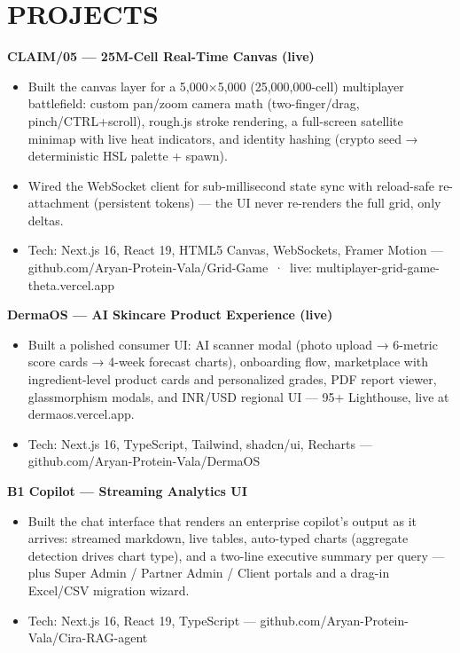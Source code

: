 \documentclass[9pt]{article}
\begin{document}
\section*{PROJECTS}
\textbf{CLAIM/05  ---  25M-Cell Real-Time Canvas (live)}
\vspace{1pt}
\begin{itemize}[leftmargin=11pt,itemsep=0pt,topsep=1pt,parsep=0pt]
\item Built the canvas layer for a 5,000×5,000 (25,000,000-cell) multiplayer battlefield: custom pan/zoom camera math (two-finger/drag, pinch/CTRL+scroll), rough.js stroke rendering, a full-screen satellite minimap with live heat indicators, and identity hashing (crypto seed → deterministic HSL palette + spawn).
\item Wired the WebSocket client for sub-millisecond state sync with reload-safe re-attachment (persistent tokens)  ---  the UI never re-renders the full grid, only deltas.
\item Tech: Next.js 16, React 19, HTML5 Canvas, WebSockets, Framer Motion  ---  github.com/Aryan-Protein-Vala/Grid-Game \,·\, live: multiplayer-grid-game-theta.vercel.app
\end{itemize}
\textbf{DermaOS  ---  AI Skincare Product Experience (live)}
\vspace{1pt}
\begin{itemize}[leftmargin=11pt,itemsep=0pt,topsep=1pt,parsep=0pt]
\item Built a polished consumer UI: AI scanner modal (photo upload → 6-metric score cards → 4-week forecast charts), onboarding flow, marketplace with ingredient-level product cards and personalized grades, PDF report viewer, glassmorphism modals, and INR/USD regional UI  ---  95+ Lighthouse, live at dermaos.vercel.app.
\item Tech: Next.js 16, TypeScript, Tailwind, shadcn/ui, Recharts  ---  github.com/Aryan-Protein-Vala/DermaOS
\end{itemize}
\textbf{B1 Copilot  ---  Streaming Analytics UI}
\vspace{1pt}
\begin{itemize}[leftmargin=11pt,itemsep=0pt,topsep=1pt,parsep=0pt]
\item Built the chat interface that renders an enterprise copilot's output as it arrives: streamed markdown, live tables, auto-typed charts (aggregate detection drives chart type), and a two-line executive summary per query  ---  plus Super Admin / Partner Admin / Client portals and a drag-in Excel/CSV migration wizard.
\item Tech: Next.js 16, React 19, TypeScript  ---  github.com/Aryan-Protein-Vala/Cira-RAG-agent
\end{itemize}
\end{document}
